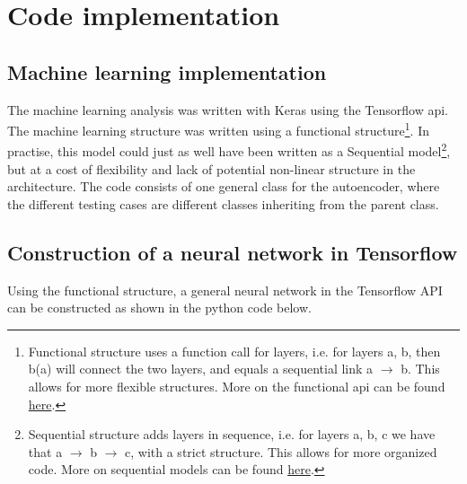 \section{Code implementation}
\subsection*{Machine learning implementation}

The machine learning analysis was written with Keras\cite{chollet2015keras} using the Tensorflow api\cite{tensorflow-whitepaper}. 
The machine learning structure was written using a functional structure\footnote{Functional structure uses a function call for layers, i.e. for layers a, b, then b(a) will connect the two layers, and equals a sequential link a $\to$ b. This allows for more flexible structures. More on the functional api can be found \href{https://www.tensorflow.org/guide/keras/functional}{here}.}.
In practise, this model could just as well have been written as a Sequential model\footnote{Sequential structure adds layers in sequence, i.e. for layers a, b, c we have that a $\to$ b $\to$ c, with a strict structure. This allows for more organized code. More on sequential models can be found \href{https://www.tensorflow.org/guide/keras/sequential_model}{here}.}, 
but at a cost of flexibility and lack of potential non-linear structure in the architecture. The code consists of one general class for
 the autoencoder, where the different testing cases are different classes inheriting from the parent class.\par



\subsection*{Construction of a neural network in Tensorflow}

Using the functional structure, a general neural network in the Tensorflow API can be constructed as shown in the python code below. 

